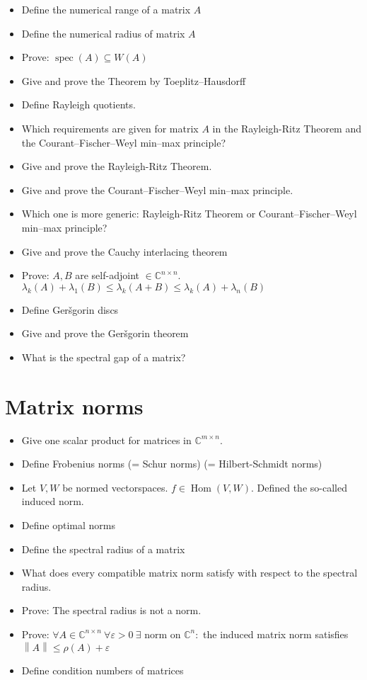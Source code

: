 \documentclass[a4paper]{article}
\newcommand{\norm}[1]{\left\|#1\right\|}
\begin{document}
\begin{itemize}
  \item Define the numerical range of a matrix $A$
  \item Define the numerical radius of matrix $A$
  \item Prove: $\operatorname{spec}(A) \subseteq W(A)$
  \item Give and prove the Theorem by Toeplitz--Hausdorff
  \item Define Rayleigh quotients.
  \item Which requirements are given for matrix $A$ in the Rayleigh-Ritz Theorem and the Courant--Fischer--Weyl min--max principle?
  \item Give and prove the Rayleigh-Ritz Theorem.
  \item Give and prove the Courant--Fischer--Weyl min--max principle.
  \item Which one is more generic: Rayleigh-Ritz Theorem or Courant--Fischer--Weyl min--max principle?
  \item Give and prove the Cauchy interlacing theorem
  \item Prove: $A, B$ are self-adjoint $\in \mathbb C^{n \times n}$. $\lambda_{k}(A) + \lambda_1(B) \leq \lambda_k(A + B) \leq \lambda_k(A) + \lambda_n(B)$
  \item Define Ger\v{s}gorin discs
  \item Give and prove the Ger\v{s}gorin theorem
  \item What is the spectral gap of a matrix?
\end{itemize}

\section{Matrix norms}

\begin{itemize}
  \item Give one scalar product for matrices in $\mathbb C^{m \times n}$.
  \item Define Frobenius norms (= Schur norms) (= Hilbert-Schmidt norms)
  \item Let $V, W$ be normed vectorspaces. $f \in \operatorname{Hom}(V, W)$. Defined the so-called induced norm.
  \item Define optimal norms
  \item Define the spectral radius of a matrix
  \item What does every compatible matrix norm satisfy with respect to the spectral radius.
  \item Prove: The spectral radius is not a norm.
  \item Prove: $\forall A \in \mathbb C^{n \times n} \: \forall \varepsilon > 0 \:\exists \text{ norm on } \mathbb C^n:$ the induced matrix norm satisfies $\norm{A} \leq \rho(A) + \varepsilon$
  \item Define condition numbers of matrices
\end{itemize}
\end{document}
